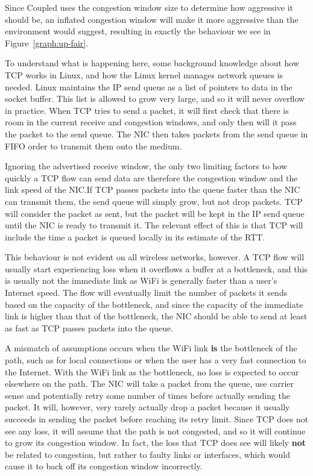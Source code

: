 Since Coupled uses the congestion window size to determine how aggressive it
should be, an inflated congestion window will make it more aggressive than the
environment would suggest, resulting in exactly the behaviour we see in
Figure~\ref{graph:up-fair}.

To understand what is happening here, some background knowledge about how TCP
works in Linux, and how the Linux kernel manages network queues is needed. Linux
maintains the IP send queue as a list of pointers to data in the socket buffer.
This list is allowed to grow very large, and so it will never overflow in
practice. When TCP tries to send a packet, it will first check that there is
room in the current receive and congestion windows, and only then will it pass
the packet to the send queue. The NIC then takes packets from the send queue in
FIFO order to transmit them onto the medium.

Ignoring the advertised receive window, the only two limiting factors to how
quickly a TCP flow can send data are therefore the congestion window and the
link speed of the NIC.\@ If TCP passes packets into the queue faster than the
NIC can transmit them, the send queue will simply grow, but not drop packets.
TCP will consider the packet as sent, but the packet will be kept in the IP send
queue until the NIC is ready to transmit it. The relevant effect of this is that
TCP will include the time a packet is queued locally in its estimate of the RTT.

This behaviour is not evident on all wireless networks, however. A TCP flow will
usually start experiencing loss when it overflows a buffer at a bottleneck, and
this is usually not the immediate link as WiFi is generally faster than a user's
Internet speed. The flow will eventually limit the number of packets it sends
based on the capacity of the bottleneck, and since the capacity of the immediate
link is higher than that of the bottleneck, the NIC should be able to send at
least as fast as TCP passes packets into the queue.

A mismatch of assumptions occurs when the WiFi link \textbf{is} the bottleneck
of the path, such as for local connections or when the user has a very fast
connection to the Internet. With the WiFi link as the bottleneck, no loss is
expected to occur elsewhere on the path. The NIC will take a packet from the
queue, use carrier sense and potentially retry some number of times before
actually sending the packet. It will, however, very rarely actually drop a
packet because it usually succeeds in sending the packet before reaching its
retry limit. Since TCP does not see any loss, it will assume that the path is
not congested, and so it will continue to grow its congestion window. In fact,
the loss that TCP does see will likely \textbf{not} be related to congestion,
but rather to faulty links or interfaces, which would cause it to back off its
congestion window incorrectly.

